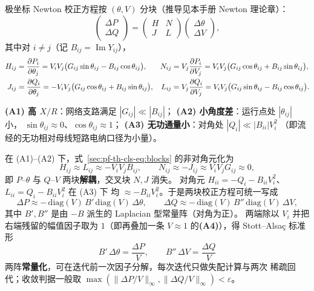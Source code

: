 极坐标 Newton 校正方程按 $(\theta,V)$ 分块（推导见本手册 Newton 理论章）：
\begin{equation}
\begin{pmatrix}\Delta P\\ \Delta Q\end{pmatrix}
=
\begin{pmatrix} H & N\\ J & L\end{pmatrix}
\begin{pmatrix}\Delta\theta\\ \Delta V\end{pmatrix},
\label{sec:pf-th-cls-eq:nrblock}
\end{equation}
其中对 $i\ne j$（记 $B_{ij}=\operatorname{Im}Y_{ij}$），
\begin{align}
H_{ij}&=\frac{\partial P_i}{\partial\theta_j}
 =V_iV_j\bigl(G_{ij}\sin\theta_{ij}-B_{ij}\cos\theta_{ij}\bigr),&
N_{ij}&=V_j\frac{\partial P_i}{\partial V_j}
 =V_iV_j\bigl(G_{ij}\cos\theta_{ij}+B_{ij}\sin\theta_{ij}\bigr),\notag\\
J_{ij}&=\frac{\partial Q_i}{\partial\theta_j}
 =-V_iV_j\bigl(G_{ij}\cos\theta_{ij}+B_{ij}\sin\theta_{ij}\bigr),&
L_{ij}&=V_j\frac{\partial Q_i}{\partial V_j}
 =V_iV_j\bigl(G_{ij}\sin\theta_{ij}-B_{ij}\cos\theta_{ij}\bigr).
\label{sec:pf-th-cls-eq:blocks}
\end{align}

\begin{definition}\label{sec:pf-th-cls-def-assump}
\textbf{(A1) 高 $X/R$}：网络支路满足 $|G_{ij}|\ll|B_{ij}|$；
\textbf{(A2) 小角度差}：运行点处 $|\theta_{ij}|$ 小，
$\sin\theta_{ij}\approx0$、$\cos\theta_{ij}\approx1$；
\textbf{(A3) 无功通量小}：对角处 $|Q_i|\ll|B_{ii}|V_i^2$
（即流经的无功相对母线短路电纳口径为小量）。
\end{definition}

在 (A1)--(A2) 下，式~\eqref{sec:pf-th-cls-eq:blocks} 的非对角元化为
\begin{equation}
H_{ij}\approx L_{ij}\approx -V_iV_jB_{ij},\qquad
N_{ij}\approx -J_{ij}\approx V_iV_jG_{ij}\approx0,
\label{sec:pf-th-cls-eq:offdiag}
\end{equation}
即 $P$--$\theta$ 与 $Q$--$V$ 两块\textbf{解耦}，交叉块 $N,J$ 消失。
对角元 $H_{ii}=-Q_i-B_{ii}V_i^2$、$L_{ii}=Q_i-B_{ii}V_i^2$ 在 (A3) 下
均 $\approx -B_{ii}V_i^2$。于是两块校正方程可统一写成
\begin{equation}
\Delta P\approx -\,\mathrm{diag}(V)\,B'\,\mathrm{diag}(V)\,\Delta\theta,
\qquad
\Delta Q\approx -\,\mathrm{diag}(V)\,B''\,\mathrm{diag}(V)\,\Delta V,
\end{equation}
其中 $B',B''$ 是由 $-B$ 派生的 Laplacian 型常量阵（对角为正）。
两端除以 $V_i$ 并把右端残留的幅值因子取为 $1$（即再叠加一条
$V\approx1$ 的\textbf{(A4)}），得 Stott--Alsa\c{c} 标准形~\cite{cls:stott}
\begin{equation}
\boxed{\;B'\,\Delta\theta=\frac{\Delta P}{V},\qquad B''\,\Delta V=\frac{\Delta Q}{V}\;}
\label{sec:pf-th-cls-eq:fdpf}
\end{equation}
两阵\textbf{常量化}，可在迭代前一次因子分解，每次迭代只做失配计算与两次
稀疏回代；收敛判据一般取
$\max(\lVert\Delta P/V\rVert_\infty,\lVert\Delta Q/V\rVert_\infty)<\varepsilon$。

